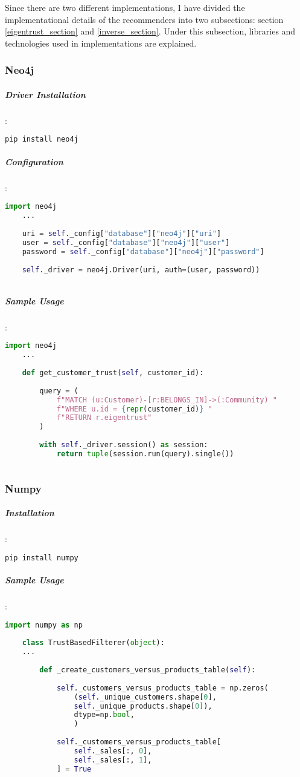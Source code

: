 	Since there are two different implementations, I have divided the implementational details of the recommenders into two subsections: section \ref{eigentrust_section} and \ref{inverse_section}. Under this subsection, libraries and technologies used in implementations are explained.
	\subsubsection{Neo4j \cite{Neo4j}}
	\subparagraph{Driver Installation}:
	\begin{lstlisting}[language=bash]
	pip install neo4j
	\end{lstlisting}
	
	\subparagraph{Configuration}:
	\begin{lstlisting}[language=python]
	import neo4j
	...
	
	uri = self._config["database"]["neo4j"]["uri"]
	user = self._config["database"]["neo4j"]["user"]
	password = self._config["database"]["neo4j"]["password"]
	
	self._driver = neo4j.Driver(uri, auth=(user, password))
	
	\end{lstlisting}
	
	\subparagraph{Sample Usage}:
	\begin{lstlisting}[language=python, caption=Neo4j driver example]
	import neo4j
	...
	
	def get_customer_trust(self, customer_id):
	
		query = (
			f"MATCH (u:Customer)-[r:BELONGS_IN]->(:Community) "
			f"WHERE u.id = {repr(customer_id)} "
			f"RETURN r.eigentrust"
		)
	
		with self._driver.session() as session:
			return tuple(session.run(query).single())
	
	\end{lstlisting}
	
	\subsubsection{Numpy \cite{Numpy}}
	\subparagraph{Installation}:
	\begin{lstlisting}[language=bash]
	pip install numpy
	\end{lstlisting}
	
	\subparagraph{Sample Usage}:
	\begin{lstlisting}[language=python, caption=Numpy example]
	import numpy as np
	
	class TrustBasedFilterer(object):
	...
	
		def _create_customers_versus_products_table(self):
	
			self._customers_versus_products_table = np.zeros(
				(self._unique_customers.shape[0],
				self._unique_products.shape[0]),
				dtype=np.bool,
				)
	
			self._customers_versus_products_table[
				self._sales[:, 0],
				self._sales[:, 1],
			] = True
	\end{lstlisting}
	

